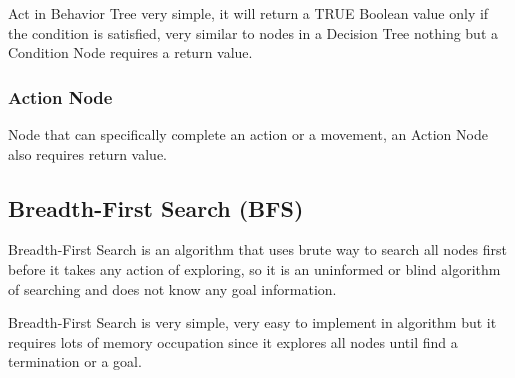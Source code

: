 Act in Behavior Tree very simple, it will return a TRUE Boolean value only if the condition is satisfied, very similar to
nodes in a Decision Tree nothing but a Condition Node requires a return value.

\subsubsection*{Action Node}

Node that can specifically complete an action or a movement, an Action Node also requires return value.



\subsection{Breadth-First Search (BFS)}

Breadth-First Search is an algorithm that uses brute way to search all nodes first before it takes any action of exploring,
so it is an uninformed or blind algorithm of searching and does not know any goal information. 

Breadth-First Search is very simple, very easy to implement in algorithm but it requires lots of memory occupation since it
explores all nodes until find a termination or a goal.


